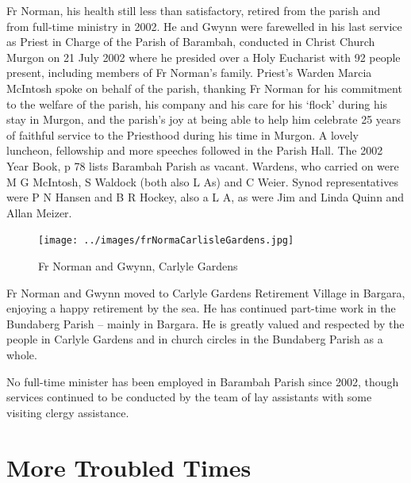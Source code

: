 Fr Norman, his health still less than satisfactory, retired from the parish and from full-time ministry in 2002. He and Gwynn were farewelled in his last service as Priest in Charge of the Parish of Barambah, conducted in Christ Church Murgon on 21 July 2002 where he presided over a Holy Eucharist with 92 people present, including members of Fr Norman's family. Priest's Warden Marcia McIntosh spoke on behalf of the parish, thanking Fr Norman for his commitment to the welfare of the parish, his company and his care for his `flock' during his stay in Murgon, and the parish's joy at being able to help him celebrate 25 years of faithful service to the Priesthood during his time in Murgon. A lovely luncheon, fellowship and more speeches followed in the Parish Hall. The 2002 Year Book, p 78 lists Barambah Parish as vacant. Wardens, who carried on were M G McIntosh, S Waldock (both also L As) and C Weier. Synod representatives were P N Hansen and B R Hockey, also a L A, as were Jim and Linda Quinn and Allan Meizer.









\begin{figure}
\begin{center}
\texttt{[image: ../images/frNormaCarlisleGardens.jpg]}
\caption{Fr Norman and Gwynn, Carlyle Gardens}
\end{center}
\end{figure}




Fr Norman and Gwynn moved to Carlyle Gardens Retirement Village in Bargara, enjoying a happy retirement by the sea. He has continued part-time work in the Bundaberg Parish -- mainly in Bargara. He is greatly valued and respected by the people in Carlyle Gardens and in church circles in the Bundaberg Parish as a whole.



No full-time minister has been employed in Barambah Parish since 2002, though services continued to be conducted by the team of lay assistants with some visiting clergy assistance.



\balance


\printendnotes[custom]
\setcounter{endnote}{0}
\chapter{More Troubled Times}
\nobalance



